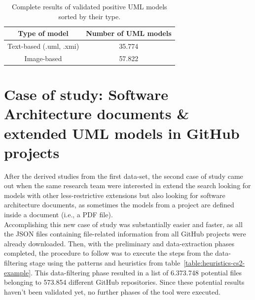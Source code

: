 \documentclass[a4paper, 12pt]{book}
\begin{document}
 \begin{table}[]
   \centering
   \caption{Complete results of validated positive UML models sorted by their type.}
   \label{table:validated-models-table}
   \begin{tabular}{|c|c|}
   \hline
   \textbf{Type of model}     & \textbf{Number of UML models}     \\ \hline
   Text-based (.uml, .xmi)    & 35.774                            \\
   Image-based                & 57.822                            \\ \hline
   \end{tabular}
 \end{table}
\section{Case of study: Software Architecture documents \& extended UML models in GitHub projects}
\label{sec:case-study-sad}
After the derived studies from the first data-set, the second case of study came out when the same research team were
interested in extend the search looking for models with other less-restrictive extensions but also looking for
software architecture documents, as sometimes the models from a project are defined inside a document (i.e., a PDF file).\\
Accomplishing this new case of study was substantially easier and faster, as all the JSON files containing file-related information
from all GitHub projects were already downloaded. Then, with the preliminary and data-extraction phases completed, the procedure to
follow was to execute the steps from the data-filtering stage using the patterns and heuristics from table~\ref{table:heuristics-cs2-example}.
This data-filtering phase resulted in a list of 6.373.748 potential files belonging to 573.854 different GitHub repositories.
Since these potential results haven't been validated yet, no further phases of the tool were executed.
\end{document}
